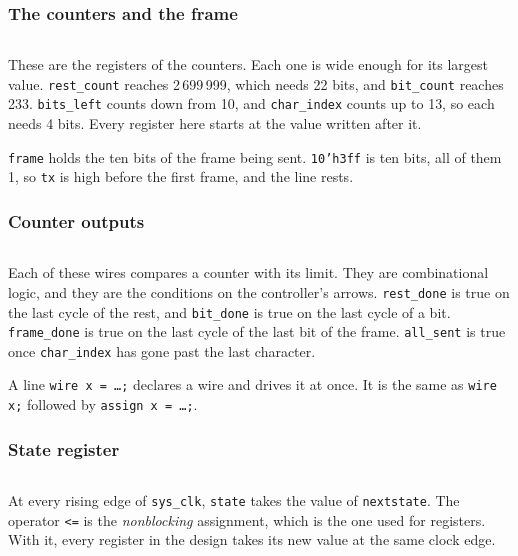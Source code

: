 \documentclass[11pt,a4paper]{article}
\begin{document}
\subsubsection*{The counters and the frame}

\inputminted[firstline=21, lastline=26]{verilog}{../rtl/hello/hello.v}

These are the registers of the counters. Each one is wide enough for its largest value. \texttt{rest\_count} reaches 2\,699\,999, which needs 22 bits, and \texttt{bit\_count} reaches 233. \texttt{bits\_left} counts down from 10, and \texttt{char\_index} counts up to 13, so each needs 4 bits. Every register here starts at the value written after it.

\texttt{frame} holds the ten bits of the frame being sent. \texttt{10'h3ff} is ten bits, all of them 1, so \texttt{tx} is high before the first frame, and the line rests.

\subsubsection*{Counter outputs}

\inputminted[firstline=28, lastline=32]{verilog}{../rtl/hello/hello.v}

Each of these wires compares a counter with its limit. They are combinational logic, and they are the conditions on the controller’s arrows. \texttt{rest\_done} is true on the last cycle of the rest, and \texttt{bit\_done} is true on the last cycle of a bit. \texttt{frame\_done} is true on the last cycle of the last bit of the frame. \texttt{all\_sent} is true once \texttt{char\_index} has gone past the last character.

A line \texttt{wire x = …;} declares a wire and drives it at once. It is the same as \texttt{wire x;} followed by \texttt{assign x = …;}.

\subsubsection*{State register}

\inputminted[firstline=34, lastline=36]{verilog}{../rtl/hello/hello.v}

At every rising edge of \texttt{sys\_clk}, \texttt{state} takes the value of \texttt{nextstate}. The operator \texttt{<=} is the \emph{nonblocking} assignment, which is the one used for registers. With it, every register in the design takes its new value at the same clock edge.
\end{document}
